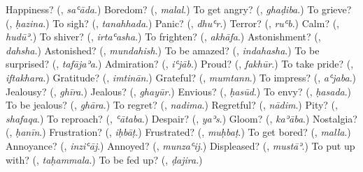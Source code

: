 \begin{tcolorbox}[breakable,colback=teal!4,colframe=teal!35!black,title={Before you move on}]
Happiness? (\textbf{}, \emph{saʿāda}.) Boredom? (\textbf{}, \emph{malal}.) To get angry? (\textbf{}, \emph{ghaḍiba}.) To grieve? (\textbf{}, \emph{ḥazina}.) To sigh? (\textbf{}, \emph{tanahhada}.) Panic? (\textbf{}, \emph{dhuʿr}.) Terror? (\textbf{}, \emph{ruʿb}.) Calm? (\textbf{}, \emph{hudūʾ}.) To shiver? (\textbf{}, \emph{irtaʿasha}.) To frighten? (\textbf{}, \emph{akhāfa}.) Astonishment? (\textbf{}, \emph{dahsha}.) Astonished? (\textbf{}, \emph{mundahish}.) To be amazed? (\textbf{}, \emph{indahasha}.) To be surprised? (\textbf{}, \emph{tafājaʾa}.) Admiration? (\textbf{}, \emph{iʿjāb}.) Proud? (\textbf{}, \emph{fakhūr}.) To take pride? (\textbf{}, \emph{iftakhara}.) Gratitude? (\textbf{}, \emph{imtinān}.) Grateful? (\textbf{}, \emph{mumtann}.) To impress? (\textbf{}, \emph{aʿjaba}.) Jealousy? (\textbf{}, \emph{ghīra}.) Jealous? (\textbf{}, \emph{ghayūr}.) Envious? (\textbf{}, \emph{ḥasūd}.) To envy? (\textbf{}, \emph{ḥasada}.) To be jealous? (\textbf{}, \emph{ghāra}.) To regret? (\textbf{}, \emph{nadima}.) Regretful? (\textbf{}, \emph{nādim}.) Pity? (\textbf{}, \emph{shafaqa}.) To reproach? (\textbf{}, \emph{ʿātaba}.) Despair? (\textbf{}, \emph{yaʾs}.) Gloom? (\textbf{}, \emph{kaʾāba}.) Nostalgia? (\textbf{}, \emph{ḥanīn}.) Frustration? (\textbf{}, \emph{iḥbāṭ}.) Frustrated? (\textbf{}, \emph{muḥbaṭ}.) To get bored? (\textbf{}, \emph{malla}.) Annoyance? (\textbf{}, \emph{inziʿāj}.) Annoyed? (\textbf{}, \emph{munzaʿij}.) Displeased? (\textbf{}, \emph{mustāʾ}.) To put up with? (\textbf{}, \emph{taḥammala}.) To be fed up? (\textbf{}, \emph{ḍajira}.)
\end{tcolorbox}
